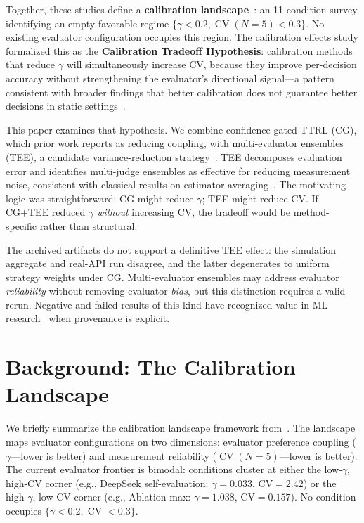 \documentclass[11pt]{article}
\DeclareMathOperator{\CV}{CV}
\begin{document}
Together, these studies define a \textbf{calibration landscape}~\cite{liu2026caleffects}: an 11-condition survey identifying an empty favorable regime $\{\gamma < 0.2, \CV(N{=}5) < 0.3\}$. No existing evaluator configuration occupies this region. The calibration effects study formalized this as the \textbf{Calibration Tradeoff Hypothesis}: calibration methods that reduce $\gamma$ will simultaneously increase CV, because they improve per-decision accuracy without strengthening the evaluator's directional signal---a pattern consistent with broader findings that better calibration does not guarantee better decisions in static settings~\cite{guo2017calibration,he2026paradox}.

This paper examines that hypothesis. We combine confidence-gated TTRL (CG), which prior work reports as reducing coupling, with multi-evaluator ensembles (TEE), a candidate variance-reduction strategy~\cite{messing2026tee}. TEE decomposes evaluation error and identifies multi-judge ensembles as effective for reducing measurement noise, consistent with classical results on estimator averaging~\cite{bubeck2012regret}. The motivating logic was straightforward: CG might reduce $\gamma$; TEE might reduce CV. If CG+TEE reduced $\gamma$ \textit{without} increasing CV, the tradeoff would be method-specific rather than structural.

The archived artifacts do not support a definitive TEE effect: the simulation aggregate and real-API run disagree, and the latter degenerates to uniform strategy weights under CG. Multi-evaluator ensembles may address evaluator \textit{reliability} without removing evaluator \textit{bias}, but this distinction requires a valid rerun. Negative and failed results of this kind have recognized value in ML research~\cite{dodge2019reproducibility} when provenance is explicit.

\section{Background: The Calibration Landscape}

We briefly summarize the calibration landscape framework from~\cite{liu2026caleffects}. The landscape maps evaluator configurations on two dimensions: evaluator preference coupling ($\gamma$---lower is better) and measurement reliability ($\CV(N{=}5)$---lower is better). The current evaluator frontier is bimodal: conditions cluster at either the low-$\gamma$, high-CV corner (e.g., DeepSeek self-evaluation: $\gamma{=}0.033$, CV${=}2.42$) or the high-$\gamma$, low-CV corner (e.g., Ablation max: $\gamma{=}1.038$, CV${=}0.157$). No condition occupies $\{\gamma < 0.2, \CV < 0.3\}$.
\end{document}
